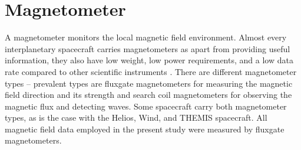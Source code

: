 \section{Magnetometer}
\label{sec:magnetometer}
A magnetometer monitors the local magnetic field environment. Almost every interplanetary spacecraft carries magnetometers as apart from providing useful information, they also have low weight, low power requirements, and a low data rate compared to other scientific instruments \citep{Ness1970}. There are different magnetometer types -- prevalent types are fluxgate magnetometers for measuring the magnetic field direction and its strength and search coil magnetometers for observing the magnetic flux and detecting waves. Some spacecraft carry both magnetometer types, as is the case with the Helios, Wind, and THEMIS spacecraft. All magnetic field data employed in the present study were measured by fluxgate magnetometers.

